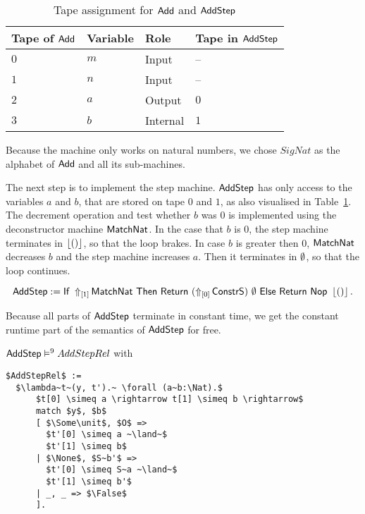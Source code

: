 \begin{table}[h]
  \centering
  \begin{tabular}{|l|l|l|l|}
    \hline
     Tape of $\MS{Add}$ & Variable & Role      & Tape in $\MS{AddStep}$ \\ \hline\hline
     $0$                & $m$      & Input     & --                     \\ \hline
     $1$                & $n$      & Input     & --                     \\ \hline
     $2$                & $a$      & Output    & $0$                    \\ \hline
     $3$                & $b$      & Internal  & $1$                    \\ \hline
  \end{tabular}
  \caption{Tape assignment for $\MS{Add}$ and $\MS{AddStep}$}
  \label{tab:tapes-Add}
\end{table}

Because the machine only works on natural numbers, we chose $SigNat$ as the alphabet of $\MS{Add}$ and all its sub-machines.

The next step is to implement the step machine.  $\MS{AddStep}$ has only access to the variables $a$ and $b$, that are stored on tape $0$ and $1$, as
also visualised in Table~\ref{tab:tapes-Add}.  The decrement operation and test whether $b$ was $0$ is implemented using the deconstructor machine
$\MS{MatchNat}$.  In the case that $b$ is $0$, the step machine terminates in $\Some\unit$, so that the loop brakes.  In case $b$ is greater then $0$,
$\MS{MatchNat}$ decreases $b$ and the step machine increases $a$.  Then it terminates in $\None$, so that the loop continues.
\begin{definition}[$\MS{AddStep}$]
  \label{def:Add_Step}
  \[
    \MS{AddStep} := \If{\LiftTapes{\MS{MatchNat}}{\Vector{1}}}{\Return{(\LiftTapes{\MS{ConstrS}}{\Vector{0}})}{\None}}{\Return{\Nop}{\Some\unit}}.
  \]
\end{definition}

Because all parts of $\MS{AddStep}$ terminate in constant time, we get the constant runtime part of the semantics of $\MS{AddStep}$ for free.
\begin{lemma}
  \label{lem:Add_Step_Sem}
  $\MS{AddStep} \RealiseIn{9} AddStepRel$ with
\begin{lstlisting}[style=semicoqstyle]
$AddStepRel$ :=
  $\lambda~t~(y, t').~ \forall (a~b:\Nat).$
      $t[0] \simeq a \rightarrow t[1] \simeq b \rightarrow$
      match $y$, $b$
      [ $\Some\unit$, $O$ =>
        $t'[0] \simeq a ~\land~$
        $t'[1] \simeq b$
      | $\None$, $S~b'$ =>
        $t'[0] \simeq S~a ~\land~$
        $t'[1] \simeq b'$
      | _, _ => $\False$
      ].
\end{lstlisting}
\end{lemma}

